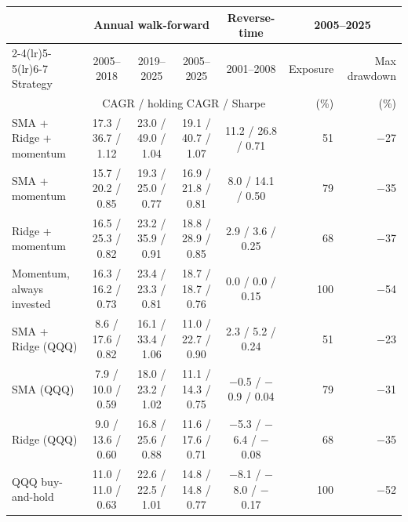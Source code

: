\begin{tabular}{lccccrr}
\toprule
 & \multicolumn{3}{c}{Annual walk-forward} & Reverse-time & \multicolumn{2}{c}{2005--2025} \\
\cmidrule(lr){2-4}\cmidrule(lr){5-5}\cmidrule(lr){6-7}
Strategy & 2005--2018 & 2019--2025 & 2005--2025 & 2001--2008 & Exposure & Max drawdown \\
 & \multicolumn{4}{c}{\footnotesize CAGR / holding CAGR / Sharpe} & (\%) & (\%) \\
\midrule
SMA + Ridge + momentum & 17.3 / 36.7 / 1.12 & 23.0 / 49.0 / 1.04 & 19.1 / 40.7 / 1.07 & 11.2 / 26.8 / 0.71 & 51 & $-$27 \\
SMA + momentum & 15.7 / 20.2 / 0.85 & 19.3 / 25.0 / 0.77 & 16.9 / 21.8 / 0.81 & 8.0 / 14.1 / 0.50 & 79 & $-$35 \\
Ridge + momentum & 16.5 / 25.3 / 0.82 & 23.2 / 35.9 / 0.91 & 18.8 / 28.9 / 0.85 & 2.9 / 3.6 / 0.25 & 68 & $-$37 \\
Momentum, always invested & 16.3 / 16.2 / 0.73 & 23.4 / 23.3 / 0.81 & 18.7 / 18.7 / 0.76 & 0.0 / 0.0 / 0.15 & 100 & $-$54 \\
\addlinespace
SMA + Ridge (QQQ) & 8.6 / 17.6 / 0.82 & 16.1 / 33.4 / 1.06 & 11.0 / 22.7 / 0.90 & 2.3 / 5.2 / 0.24 & 51 & $-$23 \\
SMA (QQQ) & 7.9 / 10.0 / 0.59 & 18.0 / 23.2 / 1.02 & 11.1 / 14.3 / 0.75 & $-$0.5 / $-$0.9 / 0.04 & 79 & $-$31 \\
Ridge (QQQ) & 9.0 / 13.6 / 0.60 & 16.8 / 25.6 / 0.88 & 11.6 / 17.6 / 0.71 & $-$5.3 / $-$6.4 / $-$0.08 & 68 & $-$35 \\
QQQ buy-and-hold & 11.0 / 11.0 / 0.63 & 22.6 / 22.5 / 1.01 & 14.8 / 14.8 / 0.77 & $-$8.1 / $-$8.0 / $-$0.17 & 100 & $-$52 \\
\bottomrule
\end{tabular}
